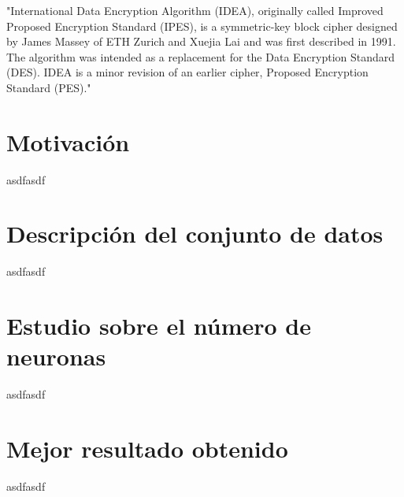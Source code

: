 \documentclass[a4paper,12pt,titlepage]{article}
\begin{document}
"International Data Encryption Algorithm (IDEA), originally called Improved Proposed Encryption Standard (IPES), is a symmetric-key block cipher designed by James Massey of ETH Zurich and Xuejia Lai and was first described in 1991. The algorithm was intended as a replacement for the Data Encryption Standard (DES). IDEA is a minor revision of an earlier cipher, Proposed Encryption Standard (PES)."  \citep{wiki:idea}

\section{Motivación}

asdfasdf

\section{Descripción del conjunto de datos}

asdfasdf

\section{Estudio sobre el número de neuronas}

asdfasdf

\section{Mejor resultado obtenido}

asdfasdf

\section{}


%
%
\end{document}
